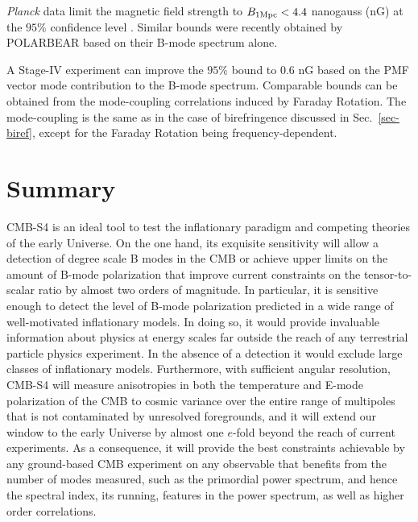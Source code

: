 {\it Planck\/} data limit the magnetic field strength to $B_{1 {\rm Mpc}}<4.4$ nanogauss (nG) at the $95\%$ confidence level \cite{Ade:2015cva}. Similar bounds were recently obtained by POLARBEAR \cite{Ade:2015cao} based on their B-mode spectrum alone.

A Stage-IV experiment can improve the $95\%$ bound to 0.6 nG based on the PMF vector mode contribution to the B-mode spectrum. Comparable bounds can be obtained from the mode-coupling correlations induced by Faraday Rotation. The mode-coupling is the same as in the case of birefringence discussed in Sec.~\ref{sec-biref}, except for the Faraday Rotation being frequency-dependent.

 
\section{Summary}
CMB-S4 is an ideal tool to test the inflationary paradigm and competing theories of the early Universe. On the one hand, its exquisite sensitivity will allow a detection of degree scale B modes in the CMB or achieve upper limits on the amount of B-mode polarization that improve current constraints on the tensor-to-scalar ratio by almost two orders of magnitude. In particular, it is sensitive enough to detect the level of B-mode polarization predicted in a wide range of well-motivated inflationary models. In doing so, it would provide invaluable information about physics at energy scales far outside the reach of any terrestrial particle physics experiment. In the absence of a detection it would exclude large classes of inflationary models. Furthermore, with sufficient angular resolution, CMB-S4 will measure anisotropies in both the temperature and E-mode polarization of the CMB to cosmic variance over the entire range of multipoles that is not contaminated by unresolved foregrounds, and it will extend our window to the early Universe by almost one $e$-fold beyond the reach of current experiments. As a consequence, it will provide the best constraints achievable by any ground-based CMB experiment on any observable that benefits from the number of modes measured, such as the primordial power spectrum, and hence the spectral index, its running, features in the power spectrum, as well as higher order correlations.


 
